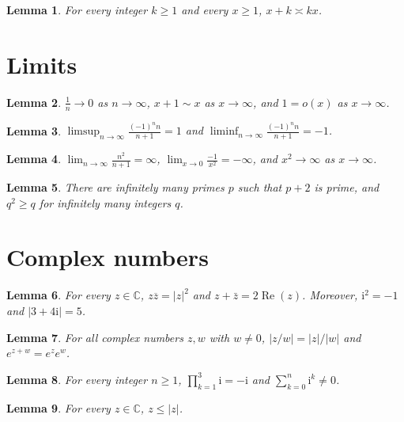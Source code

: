 \documentclass{article}
\newtheorem{lemma}{Lemma}
\begin{document}
\begin{lemma}\label{asymp}
For every integer $k\ge1$ and every $x\ge1$, $x+k\asymp kx$.
\end{lemma}

\section{Limits}

\begin{lemma}\label{limits}
$\frac1n\to0$ as $n\to\infty$, $x+1\sim x$ as $x\to\infty$, and $1=o(x)$ as $x\to\infty$.
\end{lemma}

\begin{lemma}\label{limsup}
$\limsup_{n\to\infty}\frac{(-1)^n n}{n+1}=1$ and $\liminf_{n\to\infty}\frac{(-1)^n n}{n+1}=-1$.
\end{lemma}

\begin{lemma}\label{limit-infinity}
$\lim_{n\to\infty}\frac{n^2}{n+1}=\infty$, $\lim_{x\to0}\frac{-1}{x^2}=-\infty$, and $x^2\to\infty$ as $x\to\infty$.
\end{lemma}

\begin{lemma}\label{infinitely-many}
There are infinitely many primes $p$ such that $p+2$ is prime, and $q^2\ge q$ for infinitely many integers $q$.
\end{lemma}

\section{Complex numbers}

\begin{lemma}\label{complex}
For every $z\in\mathbb C$, $z\overline{z}=|z|^2$ and $z+\bar z=2\operatorname{Re}(z)$. Moreover, $\mathrm{i}^2=-1$ and $|3+4\mathrm i|=5$.
\end{lemma}

\begin{lemma}\label{complex-noun}
For all complex numbers $z,w$ with $w\ne0$, $|z/w|=|z|/|w|$ and $e^{z+w}=e^ze^w$.
\end{lemma}

\begin{lemma}\label{complex-sum}
For every integer $n\ge1$, $\prod_{k=1}^{3}\mathrm{i}=-\mathrm{i}$ and $\sum_{k=0}^{n}\mathrm{i}^k\ne0$.
\end{lemma}

\begin{lemma}\label{complex-order}
For every $z\in\mathbb C$, $z\le|z|$.
\end{lemma}
\end{document}
